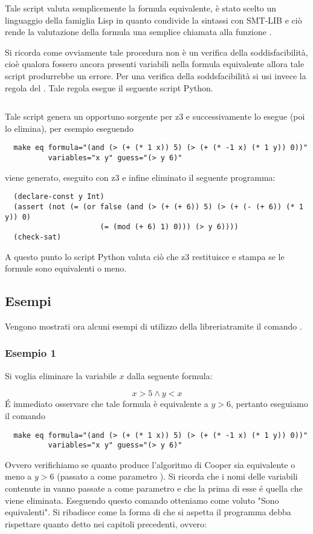 \documentclass[11pt,letterpaper,twoside]{article}
\begin{document}
Tale script valuta semplicemente la formula equivalente, è stato scelto un
linguaggio della famiglia Lisp in quanto condivide la sintassi con
SMT-LIB e ciò rende la valutazione della formula una semplice chiamata alla
funzione .

Si ricorda come ovviamente tale procedura non è un verifica della
soddisfacibilità, cioè qualora fossero ancora presenti variabili nella formula
equivalente allora tale script produrrebbe un errore. Per una verifica della
soddsfacibilità si usi invece la regola  del .
Tale regola esegue il seguente script Python\autocite{python}.

\inputminted[linenos]{python}{../eq.py}

Tale script genera un opportuno sorgente per
z3\autocite{yices} e successivamente lo esegue (poi lo elimina), per esempio eseguendo

\begin{verbatim}
  make eq formula="(and (> (+ (* 1 x)) 5) (> (+ (* -1 x) (* 1 y)) 0))"
          variables="x y" guess="(> y 6)"
\end{verbatim}

viene generato, eseguito con z3 e infine eliminato il seguente programma:

\begin{verbatim}
  (declare-const y Int)
  (assert (not (= (or false (and (> (+ (+ 6)) 5) (> (+ (- (+ 6)) (* 1 y)) 0)
                      (= (mod (+ 6) 1) 0))) (> y 6))))
  (check-sat)
\end{verbatim}

A questo punto lo script Python valuta ciò che z3 restituisce e stampa se le formule
sono equivalenti o meno.

\subsection{Esempi}
Vengono mostrati ora alcuni esempi di utilizzo della libreriatramite il comando
.
\subsubsection{Esempio 1}
Si voglia eliminare la variabile $x$ dalla seguente formula:

$$ x > 5 \land y < x $$
\'E immediato osservare che tale formula è equivalente a $y > 6$, pertanto
eseguiamo il comando
\begin{verbatim}
  make eq formula="(and (> (+ (* 1 x)) 5) (> (+ (* -1 x) (* 1 y)) 0))"
          variables="x y" guess="(> y 6)"
\end{verbatim}
Ovvero verifichiamo se quanto produce l'algoritmo di Cooper sia equivalente o
meno a $y > 6$ (passato a  come parametro ).
Si ricorda che i nomi delle variabili contenute in  vanno
passate a  come parametro  e che la prima
di esse \'e quella che viene eliminata.
Eseguendo questo comando otteniamo come voluto "Sono equivalenti".
Si ribadisce come la forma di  che si aspetta il programma debba
rispettare quanto detto nei capitoli precedenti, ovvero:
\end{document}
